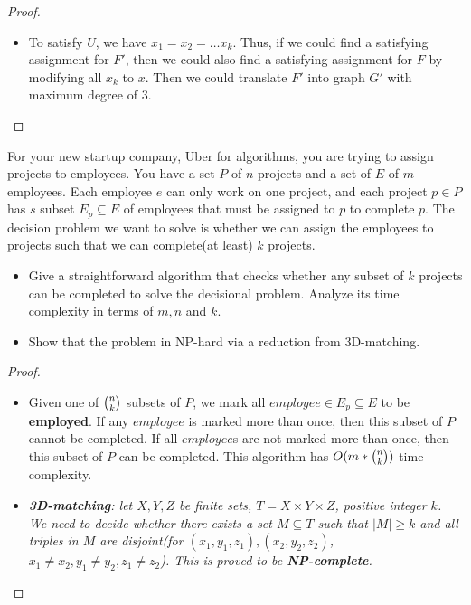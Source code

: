 \documentclass{article}
\newcounter{exercise}
\newcommand{\<}{
    \langle}
\renewcommand{\>}{
    \rangle}
\begin{document}
{\begin{proof}
\begin{itemize}
        \begin{displaymath}
            F'=F\wedge U,U=(x_1\vee \overline{x_2})(x_2\vee \overline{x_3})\ldots(x_k\vee \overline{x_1}),k\geq 3
        \end{displaymath}
        \item To satisfy $U$, we have $x_1=x_2=\ldots x_k$. Thus, if we could find a satisfying assignment for $F'$, then we could also find a satisfying assignment for $F$ by modifying all $x_k$ to $x$. Then we could translate $F'$ into graph $G'$ with maximum degree of $3$. 
    \end{itemize}
\end{proof}
\newpage

\begin{exercise}
For your new startup company, Uber for algorithms, you are trying to assign projects to employees. You have a set $P$ of $n$ projects and a set of $E$ of $m$ employees. Each employee $e$ can only work on one project, and each project $p\in P$ has $s$ subset $E_p\subseteq E$ of employees that must be assigned to $p$ to complete $p$. The decision problem we want to solve is whether we can assign the employees to projects such that we can complete(at least) $k$ projects.
\begin{itemize}
\item Give a straightforward algorithm that checks whether any subset of $k$ projects can be completed to solve the decisional problem. Analyze its time complexity in terms of $m,n$ and $k$.
\item Show that the problem in NP-hard via a reduction from 3D-matching.
\end{itemize}
\end{exercise}
\begin{proof}
    \leavevmode\newline
    \begin{itemize}
        \item Given one of $\tbinom{n}{k}$ subsets of $P$, we mark all $employee\in E_p\subseteq E$ to be \textbf{employed}. If any $employee$ is marked more than once, then this subset of $P$ cannot be completed. If all $employee$s are not marked more than once, then this subset of $P$ can be completed. This algorithm has $O(m*\tbinom{n}{k})$ time complexity.
        \item \textit{\textbf{3D-matching}: let $X,Y,Z$ be finite sets, $T=X\times Y\times Z$, positive integer $k$. We need to decide whether there exists a set $M\subseteq T$ such that $|M|\geq k$ and all triples in $M$ are disjoint(for $(x_1,y_1,z_1),(x_2,y_2,z_2)$, $x_1\neq x_2,y_1\neq y_2,z_1\neq z_2$). This is proved to be \textbf{NP-complete}.}

\end{itemize}
\end{proof}}
\end{document}
